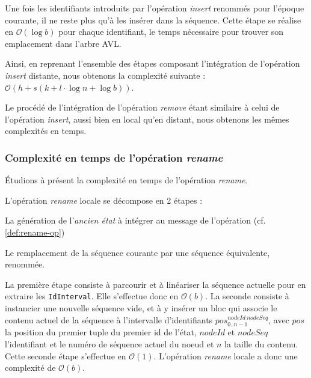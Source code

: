 \documentclass[12pt]{thesul}
\newcommand{\trm}[1]{\mathit{#1}}
\newcommand{\id}[3]{$\trm{#1}^{\trm{#2}}_{\trm{#3}}$}
\newcommand\bigO[1]{$\mathcal{O}(#1)$}
\begin{document}
Une fois les identifiants introduits par l'opération \emph{insert} renommés pour l'époque courante, il ne reste plus qu'à les insérer dans la séquence.
Cette étape se réalise en \bigO{\log{}b} pour chaque identifiant, le temps nécessaire pour trouver son emplacement dans l'arbre AVL.

Ainsi, en reprenant l'ensemble des étapes composant l'intégration de l'opération \emph{insert} distante, nous obtenons la complexité suivante : \bigO{h + s (k + l \cdot \log{}n + \log{}b)}.

Le procédé de l'intégration de l'opération \emph{remove} étant similaire à celui de l'opération \emph{insert}, aussi bien en local qu'en distant, nous obtenons les mêmes complexités en temps.

\subsubsection{Complexité en temps de l'opération \emph{rename}}

Étudions à présent la complexité en temps de l'opération \emph{rename}.

L'opération \emph{rename} locale se décompose en 2 étapes :
\begin{enumerate*}[label=(\roman*)]
  \item La génération de l'\emph{ancien état} à intégrer au message de l'opération (cf. \autoref{def:rename-op})
  \item Le remplacement de la séquence courante par une séquence équivalente, renommée.
\end{enumerate*}
La première étape consiste à parcourir et à linéariser la séquence actuelle pour en extraire les \texttt{IdInterval}.
Elle s'effectue donc en \bigO{b}.
La seconde consiste à instancier une nouvelle séquence vide, et à y insérer un bloc qui associe le contenu actuel de la séquence à l'intervalle d'identifiants \id{pos}{nodeId~nodeSeq}{0..n-1}, avec $\trm{pos}$ la position du premier tuple du premier id de l'état, $\trm{nodeId}$ et $\trm{nodeSeq}$ l'identifiant et le numéro de séquence actuel du noeud et $\trm{n}$ la taille du contenu.
Cette seconde étape s'effectue en \bigO{1}.
L'opération \emph{rename} locale a donc une complexité de \bigO{b}.
\end{document}

